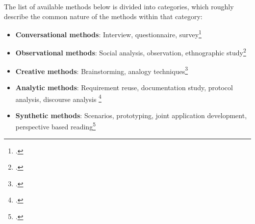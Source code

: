 The list of available methods below is divided into categories, which roughly describe the common nature of the methods within that category: 
\begin{itemize}
    \item \textbf{Conversational methods}: Interview, questionnaire, survey\footcites[Cf.][chapter 3]{PohlRequirementsengineeringfundamentals2011}[cf.][p.170]{HickeyElicitationtechniqueselection2003}
    \item \textbf{Observational methods}: Social analysis, observation, ethnographic study\footcites[Cf.][p.227]{ZhangEffectiverequirementsdevelopmentA2007}[cf.][p.173]{HickeyElicitationtechniqueselection2003}
    \item \textbf{Creative methods}: Brainstorming, analogy techniques\footcite[Cf.][chapter 3]{PohlRequirementsengineeringfundamentals2011}
    \item \textbf{Analytic methods}: Requirement reuse, documentation study, protocol analysis, discourse analysis \footcites[Cf.][p.12]{GoguenTechniquesrequirementelicitation1993}[cf.][pp.227-228]{ZhangEffectiverequirementsdevelopmentA2007}[cf.][p.2]{TiwariMethodologySelectionRequirement2017}
    \item \textbf{Synthetic methods}: Scenarios, prototyping, joint application development, perspective based reading\footcites[Cf.][p.228]{ZhangEffectiverequirementsdevelopmentA2007}[cf.][chapter 3]{PohlRequirementsengineeringfundamentals2011}[cf.][p.3]{TiwariMethodologySelectionRequirement2017}
\end{itemize}

